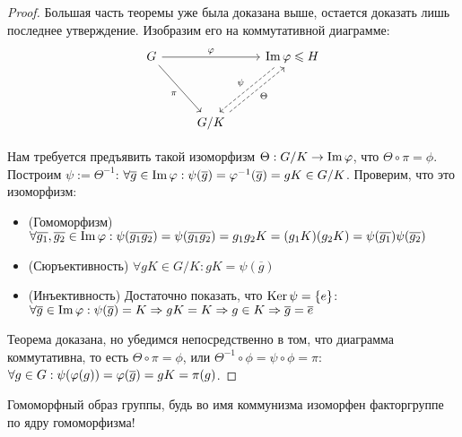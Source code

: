 \begin{proof}
	Большая часть теоремы уже была доказана выше, остается доказать лишь последнее утверждение. Изобразим его на коммутативной диаграмме:
	\[
	\begin{tikzcd}[row sep = huge]
	G \arrow{rr}{\phi} \arrow[swap]{dr}{\pi} && \im\phi \le H \arrow[dashrightarrow, swap, xshift = -4pt]{dl}{\psi}\\
	& G / K \arrow[dashrightarrow, swap, xshift = 4pt]{ur}{\Theta} &
	\end{tikzcd}
	\]
	
	Нам требуется предъявить такой изоморфизм $\Theta: G / K \to \operatorname{Im}\varphi$, что $\Theta \circ \pi = \phi$. Построим $\psi := \Theta^{-1}$: $\forall \overline{g} \in \im\phi: \psi(\overline{g}) = \phi^{-1}(\overline{g}) \hm= gK \in G / K$. Проверим, что это изоморфизм:
	\begin{itemize}
		\item (Гомоморфизм) $\forall \overline{g_1}, \overline{g_2} \in \im\phi: \psi(\overline{g_1}\overline{g_2}) = \psi(\overline{g_1g_2}) = g_1g_2K \hm= (g_1K)(g_2K) = \psi(\overline{g_1})\psi(\overline{g_2})$
		\item (Сюръективность) $\forall gK \in G / K: gK = \psi(\overline{g})$
		\item (Инъективность) Достаточно показать, что $\operatorname{Ker}\psi = \{e\}$: $\forall \overline{g} \hm\in \im\phi: \psi(\overline{g}) = K \hm\Rightarrow gK = K \Rightarrow g \in K \Rightarrow \overline{g} = \overline{e}$
	\end{itemize}
	
	Теорема доказана, но убедимся непосредственно в том, что диаграмма коммутативна, то есть $\Theta \circ \pi = \phi$, или $\Theta^{-1} \circ \phi = \psi \circ \phi = \pi$: $\forall g \hm\in G: \psi(\phi(g)) = \phi(\overline{g}) = gK = \pi(g)$.
\end{proof}

\begin{note}
	Гомоморфный образ группы, будь во имя коммунизма изоморфен факторгруппе по ядру гомоморфизма!
\end{note}